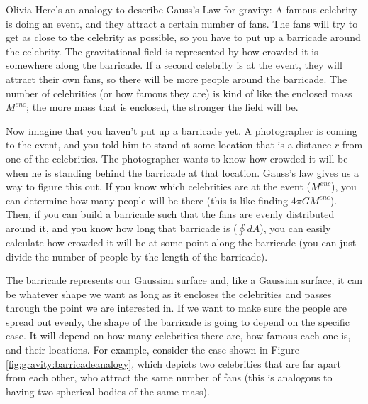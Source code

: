 \begin{studentOpinion}{Olivia}
Here's an analogy to describe Gauss's Law for gravity: A famous celebrity is doing an event, and they attract a certain number of fans. The fans will try to get as close to the celebrity as possible, so you have to put up a barricade around the celebrity. The gravitational field is represented by how crowded it is somewhere along the barricade. If a second celebrity is at the event, they will attract their own fans, so there will be more people around the barricade. The number of celebrities (or how famous they are) is kind of like the enclosed mass $M^{enc}$; the more mass that is enclosed, the stronger the field will be. 

Now imagine that you haven't put up a barricade yet. A photographer is coming to the event, and you told him to stand at some location that is a distance $r$ from one of the celebrities. The photographer wants to know how crowded it will be when he is standing behind the barricade at that location. Gauss's law gives us a way to figure this out. If you know which celebrities are at the event ($M^{enc}$), you can determine how many people will be there (this is like finding $4\pi GM^{enc}$). Then, if you can build a barricade such that the fans are evenly distributed around it, and you know how long that barricade is ($\oint dA$), you can easily calculate how crowded it will be at some point along the barricade (you can just divide the number of people by the length of the barricade). 

The barricade represents our Gaussian surface and, like a Gaussian surface, it can be whatever shape we want as long as it encloses the celebrities and passes through the point we are interested in. If we want to make sure the people are spread out evenly, the shape of the barricade is going to depend on the specific case. It will depend on how many celebrities there are, how famous each one is, and their locations. For example, consider the case shown in Figure \ref{fig:gravity:barricadeanalogy}, which depicts two celebrities that are far apart from each other, who attract the same number of fans (this is analogous to having two spherical bodies of the same mass).



\end{studentOpinion}
